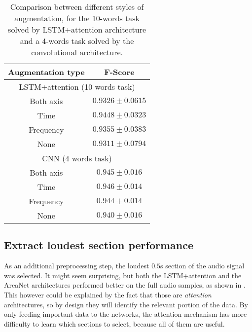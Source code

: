 \begin{table}[t!]
    \centering
    \caption{Comparison between different styles of augmentation,
    for the 10-words task solved by LSTM+attention architecture and a
    4-words task solved by the convolutional architecture.}
    \label{tab:att_augmentation_comparison}
    \begin{tabular}{|c|c|}
        \hline
        Augmentation type & F-Score \\
        \hline
        \hline
        \multicolumn{2}{|c|}{LSTM+attention (10 words task)} \\
        \hline
        Both axis & $0.9326 \pm 0.0615$ \\
        Time      & $0.9448 \pm 0.0323$ \\
        Frequency & $0.9355 \pm 0.0383$ \\
        None      & $0.9311 \pm 0.0794$ \\
        \hline
        \hline
        \multicolumn{2}{|c|}{CNN (4 words task)} \\
        \hline
        Both axis & $0.945 \pm 0.016$ \\
        Time      & $0.946 \pm 0.014$ \\
        Frequency & $0.944 \pm 0.014$ \\
        None      & $0.940 \pm 0.016$ \\
        \hline
    \end{tabular}
\end{table}


\subsection{Extract loudest section performance}

As an additional preprocessing step, the loudest $0.5$s section of the audio
signal was selected.
It might seem surprising, but both the LSTM+attention and the AreaNet
architectures performed better on the full audio samples, 
as shown in .
This however could be explained by the fact that those are \textit{attention}
architectures, so by design they will identify the relevant portion of the data.
By only feeding important data to the networks, the attention mechanism has more
difficulty to learn which sections to select, because all of them are useful.


